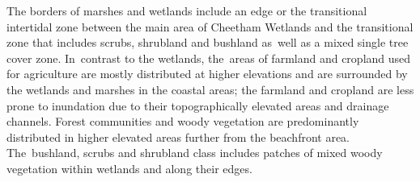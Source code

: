 \documentclass[jmse,article,accept,pdftex,oneauthor]{Definitions/mdpi}
\begin{document}
{The borders of marshes and wetlands include an edge or the transitional intertidal zone between the main area of Cheetham Wetlands and the transitional zone that includes scrubs, shrubland and bushland as~well as a mixed single tree cover zone. In~contrast to the wetlands, the~areas of farmland and cropland used for agriculture are mostly distributed at higher elevations and are surrounded by the wetlands and marshes in the coastal areas; the farmland and cropland %
	are less prone to inundation due to their topographically elevated areas and drainage channels. Forest communities and woody vegetation are predominantly distributed in higher elevated areas further from the beachfront area. The~bushland, scrubs and shrubland class includes patches of mixed woody vegetation within wetlands and along their edges.}
\end{document}
